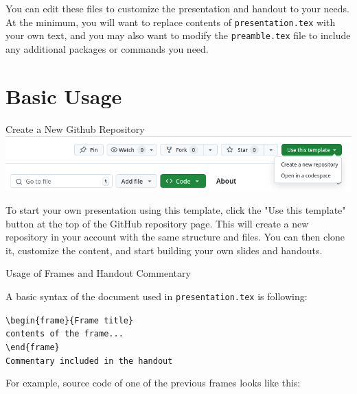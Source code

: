 You can edit these files to customize the presentation and handout to your
needs. At the minimum, you will want to replace contents of
\texttt{presentation.tex} with your own text, and you may also want to modify
the \texttt{preamble.tex} file to include any additional packages or commands
you need.

\section{Basic Usage}

\begin{frame}[fragile]{Create a New Github Repository}
  \includegraphics[width=\textwidth]{img/template-use.png}
\end{frame}

To start your own presentation using this template, click the "Use this
template" button at the top of the GitHub repository page. This will create a
new repository in your account with the same structure and files. You can then
clone it, customize the content, and start building your own slides and
handouts.


\begin{frame}[fragile]{Usage of Frames and Handout Commentary}

  \begin{block}{}
    A basic syntax of the document used in \verb|presentation.tex| is following:
  \end{block}

\begin{likeverbatim}  
  \verb|\begin{frame}{Frame title}|\\
  \verb|contents of the frame...|\\
  \verb|\end|\verb|{frame}|\\
  \vspace{1em}
  \verb|Commentary included in the handout|
\end{likeverbatim}

\end{frame}

For example, source code of one of the previous frames looks like this:

